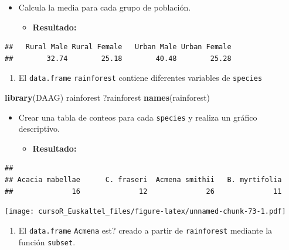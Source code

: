\documentclass[]{book}
\newenvironment{Shaded}{\begin{snugshade}}{\end{snugshade}}
\newcommand{\KeywordTok}[1]{\textcolor[rgb]{0.13,0.29,0.53}{\textbf{#1}}}
\newcommand{\NormalTok}[1]{#1}
\providecommand{\tightlist}{%
  \setlength{\itemsep}{0pt}\setlength{\parskip}{0pt}}
\begin{document}
\begin{itemize}
\item
  Calcula la media para cada grupo de población.

  \begin{itemize}
  \tightlist
  \item
    \textbf{Resultado:}
  \end{itemize}
\end{itemize}

\begin{verbatim}
##   Rural Male Rural Female   Urban Male Urban Female 
##        32.74        25.18        40.48        25.28
\end{verbatim}

\begin{enumerate}
\def\labelenumi{\arabic{enumi}.}
\setcounter{enumi}{1}
\tightlist
\item
  El \texttt{data.frame} \texttt{rainforest} contiene diferentes
  variables de \texttt{species}
\end{enumerate}

\begin{Shaded}
\begin{Highlighting}[]
\KeywordTok{library}\NormalTok{(DAAG)}
\NormalTok{rainforest}
\NormalTok{?rainforest}
\KeywordTok{names}\NormalTok{(rainforest)}
\end{Highlighting}
\end{Shaded}

\begin{itemize}
\item
  Crear una tabla de conteos para cada \texttt{species} y realiza un
  gráfico descriptivo.

  \begin{itemize}
  \tightlist
  \item
    \textbf{Resultado:}
  \end{itemize}
\end{itemize}

\begin{verbatim}
## 
## Acacia mabellae      C. fraseri  Acmena smithii   B. myrtifolia 
##              16              12              26              11
\end{verbatim}

\texttt{[image: cursoR\_Euskaltel\_files/figure-latex/unnamed-chunk-73-1.pdf]}

\begin{enumerate}
\def\labelenumi{\arabic{enumi}.}
\setcounter{enumi}{2}
\tightlist
\item
  El \texttt{data.frame} \texttt{Acmena} est? creado a partir de
  \texttt{rainforest} mediante la función \texttt{subset}.
\end{enumerate}
\end{document}
